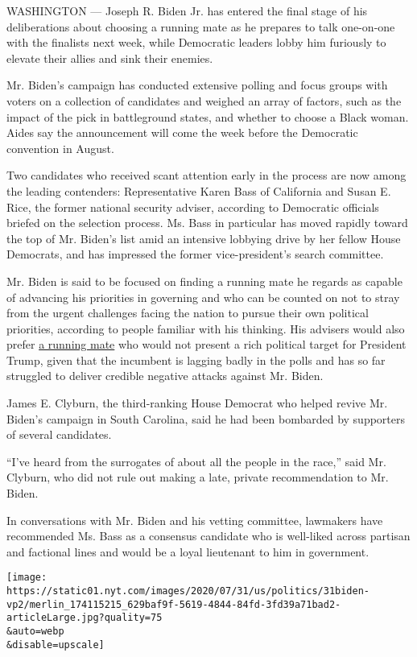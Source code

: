 WASHINGTON --- Joseph R. Biden Jr. has entered the final stage of his
deliberations about choosing a running mate as he prepares to talk
one-on-one with the finalists next week, while Democratic leaders lobby
him furiously to elevate their allies and sink their enemies.

Mr. Biden's campaign has conducted extensive polling and focus groups
with voters on a collection of candidates and weighed an array of
factors, such as the impact of the pick in battleground states, and
whether to choose a Black woman. Aides say the announcement will come
the week before the Democratic convention in August.

Two candidates who received scant attention early in the process are now
among the leading contenders: Representative Karen Bass of California
and Susan E. Rice, the former national security adviser, according to
Democratic officials briefed on the selection process. Ms. Bass in
particular has moved rapidly toward the top of Mr. Biden's list amid an
intensive lobbying drive by her fellow House Democrats, and has
impressed the former vice-president's search committee.

Mr. Biden is said to be focused on finding a running mate he regards as
capable of advancing his priorities in governing and who can be counted
on not to stray from the urgent challenges facing the nation to pursue
their own political priorities, according to people familiar with his
thinking. His advisers would also prefer
\href{https://www.nytimes.com/article/biden-vice-president-2020.html}{a
running mate} who would not present a rich political target for
President Trump, given that the incumbent is lagging badly in the polls
and has so far struggled to deliver credible negative attacks against
Mr. Biden.

James E. Clyburn, the third-ranking House Democrat who helped revive Mr.
Biden's campaign in South Carolina, said he had been bombarded by
supporters of several candidates.

``I've heard from the surrogates of about all the people in the race,''
said Mr. Clyburn, who did not rule out making a late, private
recommendation to Mr. Biden.

In conversations with Mr. Biden and his vetting committee, lawmakers
have recommended Ms. Bass as a consensus candidate who is well-liked
across partisan and factional lines and would be a loyal lieutenant to
him in government.

\texttt{[image: https://static01.nyt.com/images/2020/07/31/us/politics/31biden-vp2/merlin\_174115215\_629baf9f-5619-4844-84fd-3fd39a71bad2-articleLarge.jpg?quality=75\\\&auto=webp\\\&disable=upscale]}

